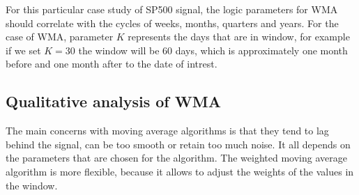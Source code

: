 \documentclass[a4paper,12pt,fleqn]{article}
\begin{document}
                For this particular case study of SP500 signal, the logic parameters for WMA should correlate with the cycles
                of weeks, months, quarters and years. For the case of WMA, parameter \begin{math}
                    K
                \end{math} represents the days that are in window, for example if we set \begin{math}
                    K = 30
                \end{math} the window will be 60 days, which is approximately one month before and one month after to
                the date of intrest.

                \subsection{Qualitative analysis of WMA}

                \hspace{1 em} The main concerns with moving average algorithms 
                is that they tend to lag behind the signal, can be too smooth or retain too much noise. It all depends on
                the parameters that are chosen for the algorithm. The weighted moving average algorithm is more flexible, 
                because it allows to adjust the weights of the values in the window.
\end{document}
